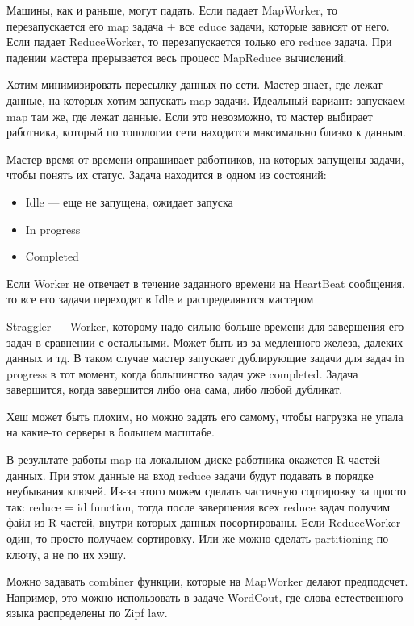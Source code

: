 \documentclass[12pt]{article}
\begin{document}
    \quad Машины, как и раньше, могут падать. Если падает MapWorker, то перезапускается его map задача + все educe задачи, которые зависят от него. Если падает ReduceWorker, то перезапускается только его reduce задача. При падении мастера прерывается весь процесс MapReduce вычислений.
    
    \quad Хотим минимизировать пересылку данных по сети. Мастер знает, где лежат данные, на которых хотим запускать map задачи. Идеальный вариант: запускаем map там же, где лежат данные. Если это невозможно, то мастер выбирает работника, который по топологии сети находится максимально близко к данным.
    
    \quad Мастер время от времени опрашивает работников, на которых запущены задачи, чтобы понять их статус. Задача находится в одном из состояний:
    \begin{itemize}
        \item Idle --- еще не запущена, ожидает запуска
        \item In progress
        \item Completed
    \end{itemize}
    Если Worker не отвечает в течение заданного времени на HeartBeat сообщения, то все его задачи переходят в Idle и распределяются мастером
    
    \quad Straggler --- Worker, которому надо сильно больше времени для завершения его задач в сравнении с остальными. Может быть из-за медленного железа, далеких данных и тд. В таком случае мастер запускает дублирующие задачи для задач in progress в тот момент, когда большинство задач уже completed. Задача завершится, когда завершится либо она сама, либо любой дубликат.
    
    \quad Хеш может быть плохим, но можно задать его самому, чтобы нагрузка не упала на какие-то серверы в большем масштабе.
    
    \quad В результате работы map на локальном диске работника окажется R частей данных. При этом данные на вход reduce задачи будут подавать в порядке неубывания ключей. Из-за этого можем сделать частичную сортировку за просто так: reduce = id function, тогда после завершения всех reduce задач получим файл из R частей, внутри которых данных посортированы. Если ReduceWorker один, то просто получаем сортировку. Или же можно сделать partitioning по ключу, а не по их хэшу.
    
    \quad Можно задавать combiner функции, которые на MapWorker делают предподсчет. Например, это можно использовать в задаче WordCout, где слова естественного языка распределены по Zipf law.
    
\end{document}
